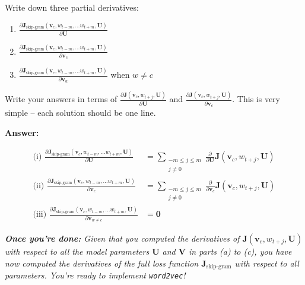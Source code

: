 \documentclass{article}
\newenvironment{answer}{
    {\bf Answer:} \sf \begingroup\color{red}
}{\endgroup}%
\begin{document}
\begin{enumerate}[label=(\alph*)]
Write down three partial derivatives: 
\begin{enumerate}[label=(\roman*)]
    \item ${\frac{\partial \bm J_{\textrm{skip-gram}}(\bm v_c, w_{t-m},\ldots w_{t+m}, \bm U)} {\partial \bm U}}$
    \item ${\frac{\partial \bm J_{\textrm{skip-gram}}(\bm v_c, w_{t-m},\ldots w_{t+m}, \bm U)} {\partial \bm v_c}}$
    \item ${\frac{\partial \bm J_{\textrm{skip-gram}}(\bm v_c, w_{t-m},\ldots w_{t+m}, \bm U)} {\partial \bm v_w}}$ when $w \ne c$
\end{enumerate}
Write your answers in terms of ${\frac{\partial \bm J(\bm v_c, w_{t+j}, \bm U)}{\partial \bm U}}$ and ${\frac{\partial \bm J(\bm v_c, w_{t+j}, \bm U)}{\partial \bm v_c}}$. This is very simple -- each solution should be one line.

\begin{shaded}
\begin{answer}
\begin{align*}
\textrm{(i) } {\frac{\partial \bm J_{\textrm{skip-gram}}(\bm v_c, w_{t-m},\ldots w_{t+m}, \bm U)} {\partial \bm U}} &= \sum_{\substack{-m\le j \le m \\ j\ne 0}} \frac{\partial}{\partial \bm U} \bm J(\bm v_c, w_{t+j}, \bm U)\\
\textrm{(ii) } {\frac{\partial \bm J_{\textrm{skip-gram}}(\bm v_c, w_{t-m},\ldots w_{t+m}, \bm U)} {\partial \bm v_c}} &= \sum_{\substack{-m\le j \le m \\ j\ne 0}} \frac{\partial}{\partial \bm v_c} \bm J(\bm v_c, w_{t+j}, \bm U)\\
\textrm{(iii) } \frac{\partial \bm J_{\textrm{skip-gram}}(\bm v_c, w_{t-m},\ldots w_{t+m}, \bm U)}{\partial \bm v_{w \neq c}} &= \bm 0
\end{align*}
\end{answer}
\end{shaded}

\textit{\textbf{Once you're done:} Given that you computed the derivatives of $\bm J(\bm v_c, w_{t+j}, \bm U)$ with respect to all the model parameters $\bm U$ and $\bm V$ in parts (a) to (c), you have now computed the derivatives of the full loss function $\bm J_{\text{skip-gram}}$ with respect to all parameters. You're ready to implement \texttt{word2vec}!} %

\end{enumerate}
\end{document}
